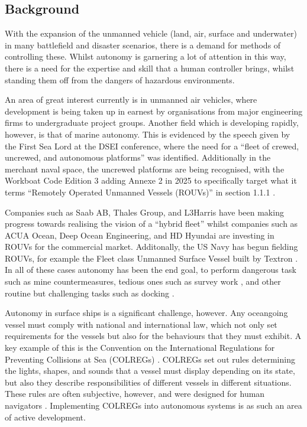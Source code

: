 \documentclass[../main.tex]{subfiles}
\begin{document}
\subsection{Background}

With the expansion of the unmanned vehicle (land, air, surface and underwater)
in many battlefield and disaster scenarios, there is a demand for methods of
controlling these. Whilst autonomy is garnering a lot of attention in this way,
there is a need for the expertise and skill that a human controller brings,
whilst standing them off from the dangers of hazardous environments.

An area of great interest currently is in unmanned air vehicles, where
development is being taken up in earnest by organisations from major engineering
firms to undergraduate project groups.
Another field which is developing rapidly, however, is that of marine autonomy.
This is evidenced by the speech given by the First Sea Lord at the DSEI conference,
where the need for a ``fleet of crewed, uncrewed, and autonomous platforms''\cite{Jenkins2025} was identified.
Additionally in the merchant naval space, the uncrewed platforms are being recognised,
with the Workboat Code Edition 3 adding Annexe 2 in 2025 to specifically target
what it terms ``Remotely Operated Unmanned Vessels (ROUVs)'' in section 1.1.1 \cite{WBC3}.

Companies such as Saab AB, Thales Group, and L3Harris \cite{SaabAB}\cite{ThalesGroup2025}\cite{L3Harris2026} have been making progress towards realising the vision of a ``hybrid fleet'' whilst companies such as ACUA Ocean, Deep Ocean Engineering, and HD Hyundai \cite{ACUAOcean2025}\cite{DeepOcean2025}\cite{HDHyundaiCoLtd2024} are investing in ROUVs for the commercial market.
Additonally, the US Navy has begun fielding ROUVs, for example the Fleet class Unmanned Surface Vessel built by Textron \cite{TextronSystems2025}.
In all of these cases autonomy has been the end goal, to perform dangerous task such as mine countermeasures, tedious ones such as survey work \cite{Manley2008}, and other routine but challenging tasks such as docking \cite{Campbell2012}.

Autonomy in surface ships is a significant challenge, however.
Any oceangoing vessel must comply with national and international law, which not only set requirements for the vessels but also for the behaviours that they must exhibit.
A key example of this is the Convention on the International Regulations for Preventing Collisions at Sea (COLREGs) \cite{COLREGS1972}.
COLREGs set out rules determining the lights, shapes, and sounds that a vessel must display depending on its state, but also they describe responsibilities of different vessels in different situations.
These rules are often subjective, however, and were designed for human navigators \cite{Campbell2012}.
Implementing COLREGs into autonomous systems is as such an area of active development.
\end{document}
